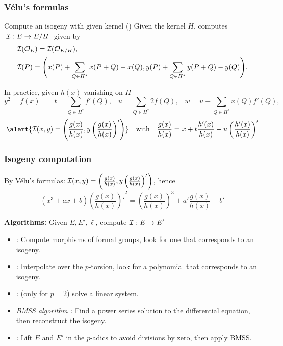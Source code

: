\documentclass[10pt,usepdftitle=false]{beamer}
\begin{document}
\begin{frame}
  \frametitle{Vélu's formulas}
  
  \begin{block}{Compute an isogeny with given kernel (\cite{velu71})}
    Given the kernel $H$, computes $\;\mathcal{I} : E\to E/H\;$ given by
    \begin{align*}
      &\mathcal{I}(\mathcal{O}_E) = \mathcal{I}(\mathcal{O}_{E/H})\text{,}\\
      &\begin{aligned}
        \mathcal{I}(P) = \Biggl(x(P) + \sum_{Q\in H^\ast}x(P+Q) - x(Q),
        y(P) + \sum_{Q\in H^\ast}y(P+Q) - y(Q) \Biggr) \text{.}
      \end{aligned}
    \end{align*}
  \end{block}

  \begin{block}{In practice, given $h(x)$ vanishing on $H$}
    {\footnotesize
      \[
      y^2 = f(x)
      \qquad
      t = \sum_{Q\in H^\ast} f'(Q)\text{,}
      \quad
      u = \sum_{Q\in H^\ast} 2f(Q)\text{,}
      \quad
      w = u + \sum_{Q\in H^\ast} x(Q)f'(Q)\text{,}\]}
    \[\alert{\I(x,y) = \left(\frac{g(x)}{h(x)}, y\left(\frac{g(x)}{h(x)}\right)'\right)}
    \quad\text{with}\quad
    \frac{g(x)}{h(x)} = x + t\frac{h'(x)}{h(x)} - u\left(\frac{h'(x)}{h(x)}\right)'\]
  \end{block}
\end{frame}


\begin{frame}
  \frametitle{Isogeny computation}
  By Vélu's formulas: $\mathcal{I}(x,y) = \left(\frac{g(x)}{h(x)},
    y\left(\frac{g(x)}{h(x)}\right)'\right)$, hence
  \[(x^3 + ax + b){\left(\frac{g(x)}{h(x)}\right)'}^2 =
  \left(\frac{g(x)}{h(x)}\right)^3 + a'\frac{g(x)}{h(x)} + b'\]
  
  \begin{block}{\textbf{Algorithms:} Given $E, E', \ell$, compute $\mathcal{I}:E\to E'$}
    \begin{itemize}
    \item \emph{\cite{couveignes94}:} Compute morphisms of formal
      groups, look for one that corresponds to an isogeny.
    \item \emph{\cite{couveignes96}:} Interpolate over the
      $p$-torsion, look for a polynomial that corresponds to an
      isogeny.
    \item \emph{\cite{lercier96}:} (only for $p=2$) solve a linear
      system.
    \item \emph{BMSS
        algorithm \parencite{bostan+morain+salvy+schost08}:} Find a
      power series solution to the differential equation, then
      reconstruct the isogeny.
    \item \emph{\cite{lercier+sirvent08}:} Lift $E$ and $E'$ in the
      $p$-adics to avoid divisions by zero, then apply BMSS.
    \end{itemize}
  \end{block}
\end{frame}
\end{document}
